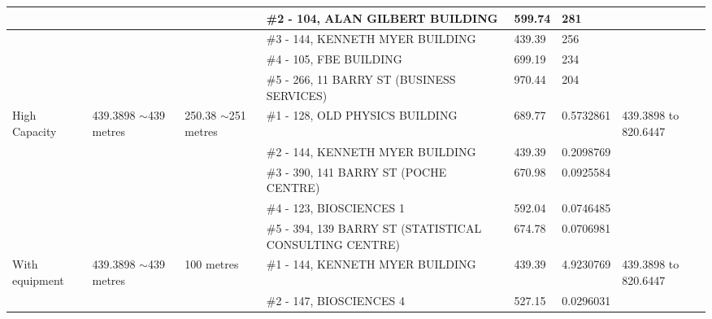 \begin{table}[H]
{\begin{tabular}{|l|l|l|l|l|l|l|}
                        &                           &                          & \#2 - 104, ALAN GILBERT BUILDING                        & 599.74        & 281             &                           \\ \hline
                        &                           &                          & \#3 - 144, KENNETH MYER BUILDING                        & 439.39        & 256             &                           \\ \hline
                        &                           &                          & \#4 - 105, FBE BUILDING                                 & 699.19        & 234             &                           \\ \hline
                        &                           &                          & \#5 - 266, 11 BARRY ST (BUSINESS SERVICES)              & 970.44        & 204             &                           \\ \hline
High Capacity           & 439.3898 $\sim$439 metres & 250.38 $\sim$251 metres  & \#1 - 128, OLD PHYSICS BUILDING                         & 689.77        & 0.5732861       & 439.3898 to 820.6447      \\ \hline
                        &                           &                          & \#2 - 144, KENNETH MYER BUILDING                        & 439.39        & 0.2098769       &                           \\ \hline
                        &                           &                          & \#3 - 390, 141 BARRY ST (POCHE CENTRE)                  & 670.98        & 0.0925584       &                           \\ \hline
                        &                           &                          & \#4 - 123, BIOSCIENCES 1                                & 592.04        & 0.0746485       &                           \\ \hline
                        &                           &                          & \#5 - 394, 139 BARRY ST (STATISTICAL CONSULTING CENTRE) & 674.78        & 0.0706981       &                           \\ \hline
With equipment         & 439.3898 $\sim$439 metres & 100 metres               & \#1 - 144, KENNETH MYER BUILDING                        & 439.39        & 4.9230769       & 439.3898 to 820.6447      \\ \hline
                        &                           &                          & \#2 - 147, BIOSCIENCES 4                                & 527.15        & 0.0296031       &                           \\ \hline

\end{tabular}}
\end{table}
